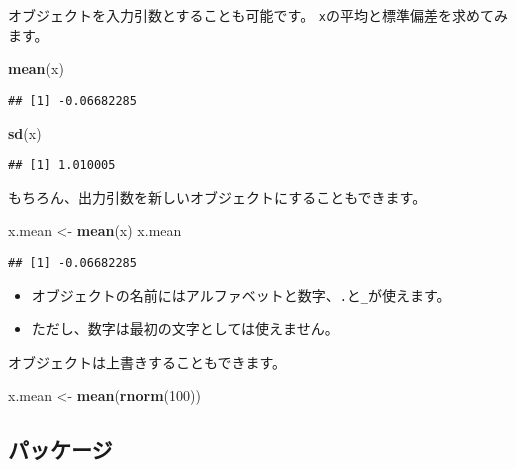 \documentclass[]{bxjsarticle}
\newenvironment{Shaded}{\begin{snugshade}}{\end{snugshade}}
\newcommand{\DecValTok}[1]{\textcolor[rgb]{0.00,0.00,0.81}{#1}}
\newcommand{\KeywordTok}[1]{\textcolor[rgb]{0.13,0.29,0.53}{\textbf{#1}}}
\newcommand{\NormalTok}[1]{#1}
\newcommand{\StringTok}[1]{\textcolor[rgb]{0.31,0.60,0.02}{#1}}
\providecommand{\tightlist}{%
  \setlength{\itemsep}{0pt}\setlength{\parskip}{0pt}}
\begin{document}
オブジェクトを入力引数とすることも可能です。
\texttt{x}の平均と標準偏差を求めてみます。

\begin{Shaded}
\begin{Highlighting}[]
\KeywordTok{mean}\NormalTok{(x)}
\end{Highlighting}
\end{Shaded}

\begin{verbatim}
## [1] -0.06682285
\end{verbatim}

\begin{Shaded}
\begin{Highlighting}[]
\KeywordTok{sd}\NormalTok{(x)}
\end{Highlighting}
\end{Shaded}

\begin{verbatim}
## [1] 1.010005
\end{verbatim}

もちろん、出力引数を新しいオブジェクトにすることもできます。

\begin{Shaded}
\begin{Highlighting}[]
\NormalTok{x.mean <-}\StringTok{ }\KeywordTok{mean}\NormalTok{(x)}
\NormalTok{x.mean}
\end{Highlighting}
\end{Shaded}

\begin{verbatim}
## [1] -0.06682285
\end{verbatim}

\begin{itemize}
\tightlist
\item
  オブジェクトの名前にはアルファベットと数字、\texttt{.}と\texttt{\_}が使えます。
\item
  ただし、数字は最初の文字としては使えません。
\end{itemize}

オブジェクトは上書きすることもできます。

\begin{Shaded}
\begin{Highlighting}[]
\NormalTok{x.mean <-}\StringTok{ }\KeywordTok{mean}\NormalTok{(}\KeywordTok{rnorm}\NormalTok{(}\DecValTok{100}\NormalTok{))}
\end{Highlighting}
\end{Shaded}

\hypertarget{ux30d1ux30c3ux30b1ux30fcux30b8}{%
\subsection{パッケージ}\label{ux30d1ux30c3ux30b1ux30fcux30b8}}
\end{document}
